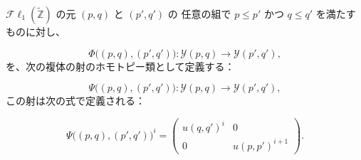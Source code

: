$\mathcal{F}\ell_1(\widetilde{\mathbb Z})$ の元 $(p,q)$ と $(p',q')$ の
任意の組で $p\leq p'$ かつ $q\leq q'$ を満たすものに対し、

\begin{equation}
\Phi\bigl((p,q),(p',q')\bigr)\colon
\mathcal Y(p,q)\longrightarrow\mathcal Y(p',q'),
\tag{4.1.1.3}
\end{equation}
を、次の複体の射のホモトピー類として定義する：

\begin{equation}
\Psi\bigl((p,q),(p',q')\bigr)\colon
\mathcal Y(p,q)\longrightarrow\mathcal Y(p',q'),
\tag{4.1.1.4}
\end{equation}
この射は次の式で定義される：

\begin{equation}
\Psi\bigl((p,q),(p',q')\bigr)^i
=
\begin{pmatrix}
u(q,q')^i & 0\\
0 & u(p,p')^{i+1}
\end{pmatrix}.
\tag{4.1.1.5}
\end{equation}
\endgroup
